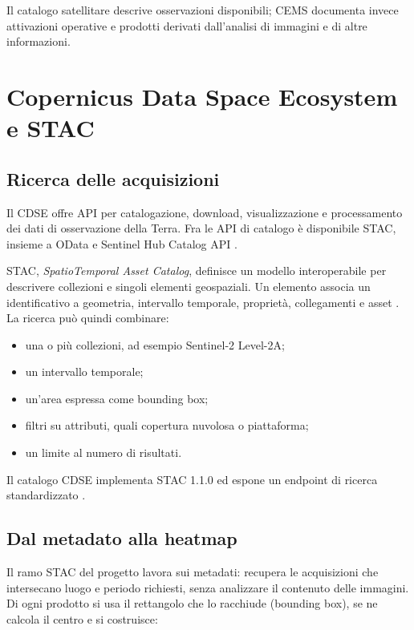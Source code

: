 Il catalogo satellitare descrive osservazioni disponibili; CEMS documenta
invece attivazioni operative e prodotti derivati dall'analisi di immagini e di
altre informazioni.

\section{Copernicus Data Space Ecosystem e STAC}

\subsection{Ricerca delle acquisizioni}

Il CDSE offre API per catalogazione, download, visualizzazione e processamento
dei dati di osservazione della Terra. Fra le API di catalogo è disponibile
STAC, insieme a OData e Sentinel Hub Catalog API \cite{cdseApis}.

STAC, \emph{SpatioTemporal Asset Catalog}, definisce un modello interoperabile
per descrivere collezioni e singoli elementi geospaziali. Un elemento associa
un identificativo a geometria, intervallo temporale, proprietà, collegamenti e
asset \cite{stacSpec}. La ricerca può quindi combinare:

\begin{itemize}
    \item una o più collezioni, ad esempio Sentinel-2 Level-2A;
    \item un intervallo temporale;
    \item un'area espressa come bounding box;
    \item filtri su attributi, quali copertura nuvolosa o piattaforma;
    \item un limite al numero di risultati.
\end{itemize}

Il catalogo CDSE implementa STAC 1.1.0 ed espone un endpoint di ricerca
standardizzato \cite{cdseStac}.

\subsection{Dal metadato alla heatmap}

Il ramo STAC del progetto lavora sui metadati: recupera le acquisizioni che
intersecano luogo e periodo richiesti, senza analizzare il contenuto delle
immagini. Di ogni prodotto si usa il rettangolo che lo racchiude (bounding box),
se ne calcola il centro e si costruisce:


